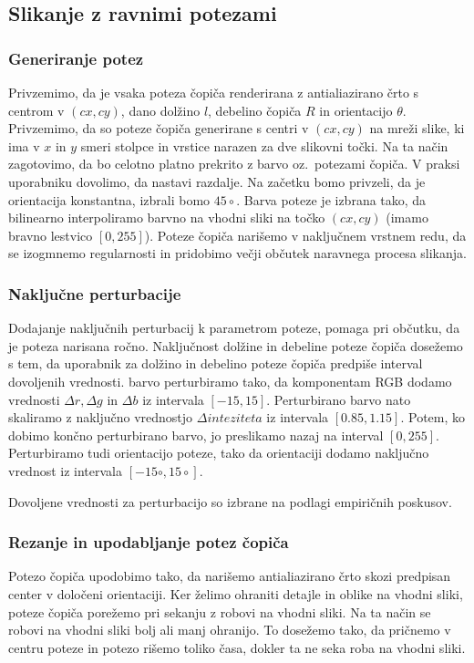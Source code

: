 \subsection{Slikanje z ravnimi potezami}
\subsubsection{Generiranje potez}
Privzemimo, da je vsaka poteza čopiča renderirana z antialiazirano črto s centrom v $(cx, cy)$, dano dolžino $l$, debelino čopiča $R$ in orientacijo $\theta$. Privzemimo, da so poteze čopiča generirane s centri v $(cx, cy)$ na mreži slike, ki ima v $x$ in $y$ smeri stolpce in vrstice narazen za dve slikovni točki. Na ta način zagotovimo, da bo celotno platno prekrito z barvo oz.\ potezami čopiča. V praksi uporabniku dovolimo, da nastavi razdalje. Na začetku bomo privzeli, da je orientacija konstantna, izbrali bomo $45 \circ$. Barva poteze je izbrana tako, da bilinearno interpoliramo barvno na vhodni sliki na točko $(cx, cy)$ (imamo bravno lestvico $[0, 255]$). Poteze čopiča narišemo v naključnem vrstnem redu, da se izogmnemo regularnosti in pridobimo večji občutek naravnega procesa slikanja.
%
\subsubsection{Naključne perturbacije}
Dodajanje naključnih perturbacij k parametrom poteze, pomaga pri občutku, da je poteza narisana ročno. Naključnost dolžine in debeline poteze čopiča dosežemo s tem, da uporabnik za dolžino in debelino poteze čopiča predpiše interval dovoljenih vrednosti. barvo perturbiramo tako, da komponentam RGB dodamo vrednosti $\Delta r, \Delta g$ in $\Delta b$ iz intervala $[-15, 15]$. Perturbirano barvo nato skaliramo z naključno vrednostjo $\Delta inteziteta$ iz intervala $[0.85, 1.15]$. Potem, ko dobimo končno perturbirano barvo, jo preslikamo nazaj na interval $[0, 255]$. Perturbiramo tudi orientacijo poteze, tako da orientaciji dodamo naključno vrednost iz intervala $[-15 \circ, 15 \circ]$.
%
\begin{opomba}
Dovoljene vrednosti za perturbacijo so izbrane na podlagi empiričnih poskusov.
\end{opomba}
%
\subsubsection{Rezanje in upodabljanje potez čopiča}
Potezo čopiča upodobimo tako, da narišemo antialiazirano črto skozi predpisan center v določeni orientaciji. Ker želimo ohraniti detajle in oblike na vhodni sliki, poteze čopiča porežemo pri sekanju z robovi na vhodni sliki. Na ta način se robovi na vhodni sliki bolj ali manj ohranijo. To dosežemo tako, da pričnemo v centru poteze in potezo rišemo toliko časa, dokler ta ne seka roba na vhodni sliki.

